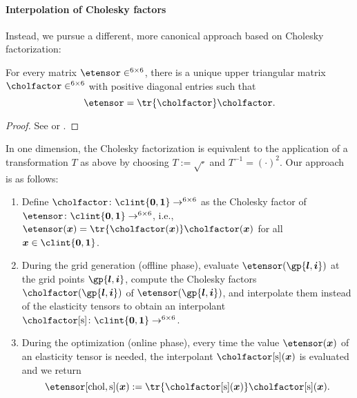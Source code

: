 \paragraph{Interpolation of Cholesky factors}

Instead, we pursue a different, more canonical
approach based on Cholesky factorization:

\begin{proposition}
  For every \spd matrix $\etensor \in \real^{6 \times 6}$,
  there is a unique upper triangular matrix
  $\cholfactor \in \real^{6 \times 6}$
  with positive diagonal entries such that
  \begin{equation}
    \etensor
    = \tr{\cholfactor} \cholfactor.
  \end{equation}
\end{proposition}

\begin{proof}
  See \cite{Benoit24Note} or \cite{Freund07Stoer}.
\end{proof}

In one dimension, the Cholesky factorization is equivalent
to the application of a transformation $T$ as above by choosing
$T := \sqrt{\cdot}$ and $T^{-1} = (\cdot)^2$.
Our approach is as follows:
\begin{enumerate}
  \item
  Define $\cholfactor\colon \clint{\*0, \*1} \to \real^{6 \times 6}$
  as the Cholesky factor of
  $\etensor\colon \clint{\*0, \*1} \to \real^{6 \times 6}$, i.e.,
  $\etensor(\*x) = \tr{\cholfactor(\*x)} \cholfactor(\*x)$
  for all $\*x \in \clint{\*0, \*1}$.
  
  \item
  During the grid generation (offline phase),
  evaluate $\etensor(\gp{\*l,\*i})$ at the grid points $\gp{\*l,\*i}$,
  compute the Cholesky factors $\cholfactor(\gp{\*l,\*i})$ of
  $\etensor(\gp{\*l,\*i})$,
  and interpolate them instead of the elasticity tensors
  to obtain an interpolant
  $\cholfactor[\sparse]\colon \clint{\*0, \*1} \to \real^{6 \times 6}$.
  
  \item
  During the optimization (online phase),
  every time the value $\etensor(\*x)$ of an elasticity tensor is needed,
  the interpolant $\cholfactor[\sparse](\*x)$ is evaluated and we return
  \begin{equation}
    \etensor[\chol,\sparse](\*x)
    := \tr{\cholfactor[\sparse](\*x)} \cholfactor[\sparse](\*x).
  \end{equation}
\end{enumerate}

